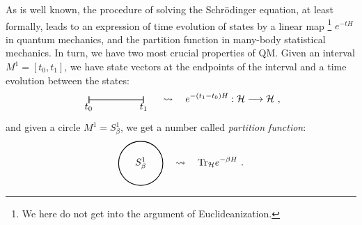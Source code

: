 As is well known, the procedure of solving the Schr\"{o}dinger equation, at least formally, leads
to an expression of time evolution of states by a linear map%
%
\footnote{We here do not get into the argument of Euclideanization.}
%
$e^{-tH}$ in quantum mechanics, and the partition function in many-body
statistical mechanics. In turn, we have two most crucial properties
of QM. Given an interval $M^{1}=\left[t_{0},t_{1}\right]$, we have
state vectors at the endpoints of the interval and a time evolution
between the states:
\begin{equation}
    \begin{tikzpicture}[scale=1.0, baseline=(x.base)]    \node (x) at (0,0) {\vphantom{x}};

        \draw[thick, arrows=|-|] (0,0) node[below=0.1] {$t_0$} -- (2,0) node[below=0.1] {$t_1$};

    \end{tikzpicture}
  \quad \rightsquigarrow \quad
  e^{-(t_{1}-t_{0})H} : \mathcal{H}  \longrightarrow  \mathcal{H}
~ ,
\label{eq:qm_linearmap}
\end{equation}
and given a circle $M^{1}=S_{\beta}^{1}$, we get a number called
\emph{partition function}:
\begin{equation}
    \begin{tikzpicture}[scale=0.8, baseline=(x.base)]    \node (x) at (0,0) {\vphantom{x}};

        \draw[thick] (0,0) circle[radius=1cm] node {$S^1_{\beta}$};

    \end{tikzpicture}
  \quad \rightsquigarrow \quad
  \mathrm{Tr}_{\mathcal{H}}  e^{-\beta H}
~ .
\label{eq:qm_number}
\end{equation}


